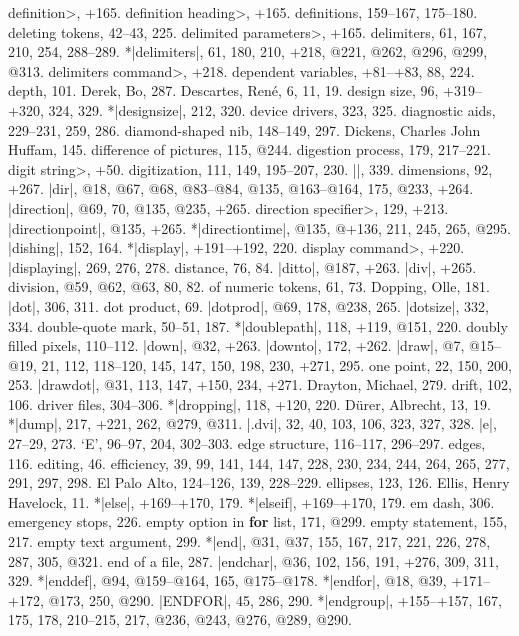 \<definition>, +165.
\<definition heading>, +165.
definitions, 159--167, 175--180.
deleting tokens, 42--43, 225.
\<delimited parameters>, +165.
delimiters, 61, 167, 210, 254, 288--289.
*|delimiters|, 61, 180, 210, +218, @221, @262, @296, @299, @313.
\<delimiters command>, +218.
dependent variables, +81--+83, 88, 224.
depth, 101.
Derek, Bo, 287.
Descartes, Ren\'e, 6, 11, 19.
design size, 96, +319--+320, 324, 329.
*|designsize|, 212, 320.
device drivers, 323, 325.
diagnostic aids, 229--231, 259, 286.
diamond-shaped nib, 148--149, 297.
Dickens, Charles John Huffam, 145.
difference of pictures, 115, @244.
digestion process, 179, 217--221.
\<digit string>, +50.
digitization, 111, 149, 195--207, 230.
|\digits|, 339.
dimensions, 92, +267.
|dir|, @18, @67, @68, @83--@84, @135, @163--@164, 175, @233, +264.
|direction|, @69, 70, @135, @235, +265.
\<direction specifier>, 129, +213.
|directionpoint|, @135, +265.
*|directiontime|, @135, @+136, 211, 245, 265, @295.
|dishing|, 152, 164.
*|display|, +191--+192, 220.
\<display command>, +220.
|displaying|, 269, 276, 278.
distance, 76, 84.
|ditto|, @187, +263.
|div|, +265.
division, @59, @62, @63, 80, 82.
\sub of numeric tokens, 61, 73.
Dopping, Olle, 181.
|dot|, 306, 311.
dot product, 69.
|dotprod|, @69, 178, @238, 265.
|dotsize|, 332, 334.
double-quote mark, 50--51, 187.
*|doublepath|, 118, +119, @151, 220.
doubly filled pixels, 110--112.
|down|, @32, +263.
|downto|, 172, +262.
|draw|, @7, @15--@19, 21, 112, 118--120, 145, 147, 150, 198, 230, +271, 295.
\sub one point, 22, 150, 200, 253.
|drawdot|, @31, 113, 147, +150, 234, +271.
Drayton, Michael, 279.
drift, 102, 106.
driver files, 304--306.
*|dropping|, 118, +120, 220.
D\"urer, Albrecht, 13, 19.
*|dump|, 217, +221, 262, @279, @311.
|.dvi|, 32, 40, 103, 106, 323, 327, 328.
\newletter
|e|, 27--29, 273.
`E', 96--97, 204, 302--303.
edge structure, 116--117, 296--297.
edges, 116.
editing, 46.
efficiency, 39, 99, 141, 144, 147, 228, 230, 234, 244, 264, 265, 277,
 291, 297, 298.
El Palo Alto, 124--126, 139, 228--229.
ellipses, 123, 126.
Ellis, Henry Havelock, 11.
*|else|, +169--+170, 179.
*|elseif|, +169--+170, 179.
em dash, 306.
emergency stops, 226.
empty option in {\bf for\/} list, 171, @299.
empty statement, 155, 217.
empty text argument, 299.
*|end|, @31, @37, 155, 167, 217, 221, 226, 278, 287, 305, @321.
end of a file, 287.
|endchar|, @36, 102, 156, 191, +276, 309, 311, 329.
*|enddef|, @94, @159--@164, 165, @175--@178.
*|endfor|, @18, @39, +171--+172, @173, 250, @290.
|ENDFOR|, 45, 286, 290.
*|endgroup|, +155--+157, 167, 175, 178, 210--215, 217, @236, @243,
 @276, @289, @290.
